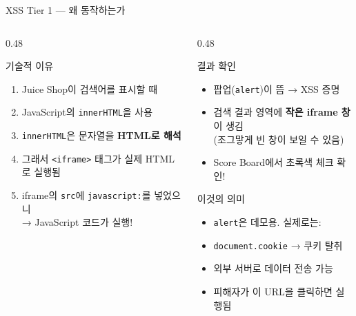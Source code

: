 \documentclass[aspectratio=169,10pt]{beamer}
\newcommand{\hlt}[1]{\textcolor{accent}{\textbf{#1}}}
\begin{document}
\begin{frame}[shrink=15]{XSS Tier 1 — 왜 동작하는가}

\begin{columns}[T]
\begin{column}{0.48\textwidth}
\begin{block}{기술적 이유}
\begin{enumerate}
    \item Juice Shop이 검색어를 표시할 때
    \item JavaScript의 \texttt{innerHTML}을 사용
    \item \texttt{innerHTML}은 문자열을 \hlt{HTML로 해석}
    \item 그래서 \texttt{<iframe>} 태그가 실제 HTML로 실행됨
    \item iframe의 \texttt{src}에 \texttt{javascript:}를 넣었으니\\
          → JavaScript 코드가 실행!
\end{enumerate}
\end{block}
\end{column}
\begin{column}{0.48\textwidth}
\begin{block}{결과 확인}
\begin{itemize}
    \item 팝업(\texttt{alert})이 뜸 → XSS 증명
    \item 검색 결과 영역에 \hlt{작은 iframe 창}이 생김\\
          {\footnotesize (조그맣게 빈 창이 보일 수 있음)}
    \item Score Board에서 초록색 체크 확인!
\end{itemize}
\end{block}

\vspace{0.3em}
\begin{alertblock}{이것의 의미}
\begin{itemize}
    \item \texttt{alert}은 데모용. 실제로는:
    \item \texttt{document.cookie} → 쿠키 탈취
    \item 외부 서버로 데이터 전송 가능
    \item 피해자가 이 URL을 클릭하면 실행됨
\end{itemize}
\end{alertblock}
\end{column}
\end{columns}
\end{frame}
\end{document}
